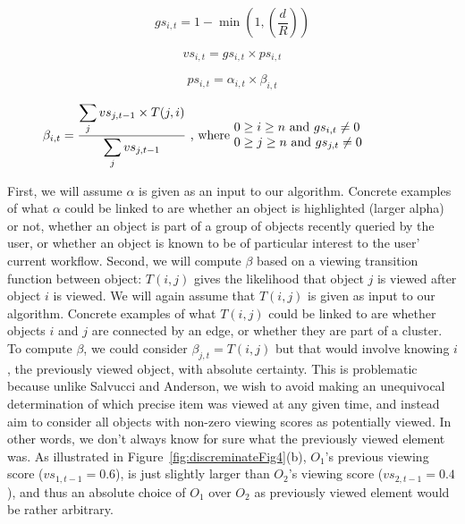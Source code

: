 \begin{equation}
gs_{i,t} = 1 - \min (1, (\frac{d}{R}))
\label{eq:GS}
\end{equation}

\begin{equation}
vs_{i,t} = gs_{i,t} \times ps_{i,t}
\label{eq:VS}
\end{equation}

\begin{equation}
ps_{i,t} = \alpha_{i,t} \times \beta_{i,t}
\label{eq:ps}
\end{equation}

\begin{equation}
\beta_{i,t} = \frac{\displaystyle\sum_{j} {vs_{j,t-1} \times T(j,i)}}{\displaystyle\sum_{j} vs_{j,t-1}} \text{ , where  } \parbox{15em}{$0\geq i \geq n$ and $gs_{i,t} \neq 0$\\ $0\geq j \geq n$ and $gs_{j,t} \neq 0$}
\label{eq:beta}
\end{equation}


First, we will assume $\alpha$ is given as an input to our algorithm. Concrete examples of what $\alpha$ could be linked to are whether an object is highlighted (larger alpha) or not, whether an object is part of a group of objects recently queried by the user, or whether an object is known to be of particular interest to the user’ current workflow. 
Second, we will compute $\beta$ based on a viewing transition function between object:  $T(i,j)$ gives the likelihood that object $j$ is viewed after object $i$ is viewed. We will again assume that $T(i,j)$ is given as input to our algorithm. Concrete examples of what $T(i,j)$ could be linked to are whether objects $i$ and $j$ are connected by an edge, or whether they are part of a cluster. To compute $\beta$, we could consider $\beta_{j,t} = T(i,j)$ but that would involve knowing $i$, the previously viewed object, with absolute certainty. This is problematic because unlike Salvucci and Anderson, we wish to avoid making an unequivocal determination of which precise item was viewed at any given time, and instead aim to consider all objects with non-zero viewing scores as potentially viewed. In other words, we don't always know for sure what the previously viewed element was. As illustrated in Figure~\ref{fig:discreminateFig4}(b), $O_1$'s previous viewing score ($vs_{1,t-1}=0.6$), is just slightly larger than $O_2$'s viewing score ($vs_{2,t-1}=0.4$), and thus an absolute choice of $O_1$ over $O_2$ as previously viewed element would be rather arbitrary. 

